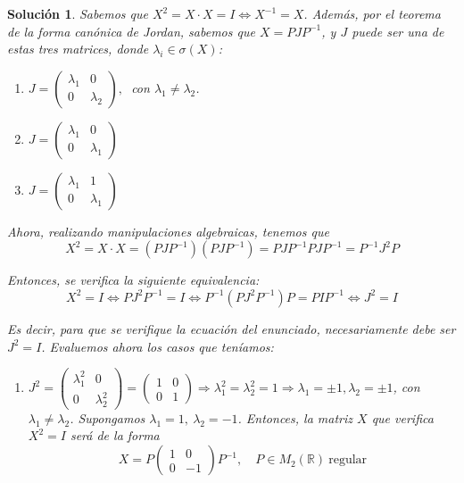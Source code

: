 \documentclass[11pt, a4paper]{article}
\newif\IfInSansMode
\numberwithin{equation}{section}
\newcommand{\R}{\mathbb{R}}
\theoremstyle{theorem-style}
\theoremstyle{definition-style}
\theoremstyle{remark-style}
\newtheorem*{sol}{Solución}
\theoremstyle{example-style}
\newenvironment{nlist}
{\begin{enumerate}
    \renewcommand\labelenumi{(\emph{\roman{enumi})}}}
{\end{enumerate}}
\begin{document}
    \begin{sol} Sabemos que $X^2 = X \cdot X = I \iff X^{-1} = X$. Además, por el \textit{teorema de la forma canónica de Jordan}, sabemos que $X = PJP^{-1}$, y $J$ puede ser una de estas tres matrices, donde $\lambda_i \in \sigma(X)$:
        \begin{nlist}
        \item $J =
            \begin{pmatrix}
                \lambda_1 & 0\\
                0 & \lambda_2
            \end{pmatrix},\ $ con $\lambda_1 \neq \lambda_2$.
        \item  $J =
            \begin{pmatrix}
                \lambda_1 & 0\\
                0 & \lambda_1
            \end{pmatrix}$
        \item  $J =
            \begin{pmatrix}
                \lambda_1 & 1 \\
                0 & \lambda_1
            \end{pmatrix}$
        \end{nlist}

        Ahora, realizando manipulaciones algebraicas, tenemos que
        $$X^2 = X\cdot X = (PJP^{-1})(PJP^{-1}) = PJP^{-1}PJP^{-1} = P^{-1}J^2P$$

        Entonces, se verifica la siguiente equivalencia: $$X^2 = I \iff PJ^2P^{-1} = I \iff P^{-1}(PJ^2P^{-1})P = P I P^{-1} \iff J^2 = I$$

        Es decir, para que se verifique la ecuación del enunciado, necesariamente debe ser $J^2 = I$. Evaluemos ahora los casos que teníamos:
        \begin{nlist}
        \item $J^2 =
            \begin{pmatrix}
                \lambda_1^2 & 0 \\
                0 & \lambda_2^2
            \end{pmatrix} =
            \begin{pmatrix}
                1 & 0 \\
                0 & 1
            \end{pmatrix} \Rightarrow \lambda_1^2 = \lambda_2^2 = 1 \Rightarrow
            \lambda_1 = \pm 1, \lambda_2 = \pm 1$, con $\lambda_1 \ne \lambda_2$. Supongamos $\lambda_1 = 1,\ \lambda_2 = -1$. Entonces, la matriz $X$ que verifica $X^2 = I$ será de la forma
            $$X = P
            \begin{pmatrix}
                1 &  0\\
                0& -1
            \end{pmatrix}P^{-1},\quad P \in M_2(\R)\ \text{regular}$$


\end{nlist}
\end{sol}
\end{document}
